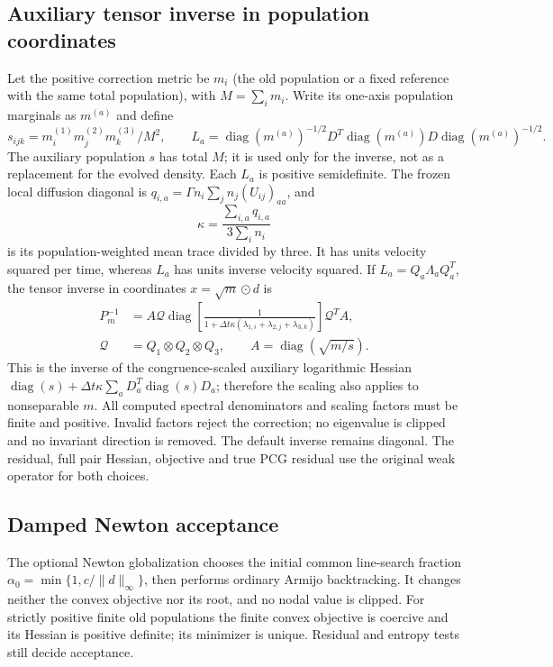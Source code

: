\documentclass[11pt,letterpaper]{article}
\begin{document}
\subsection{Auxiliary tensor inverse in population coordinates}
Let the positive correction metric be $m_i$ (the old population or a fixed
reference with the same total population), with $M=\sum_i m_i$. Write its
one-axis population marginals as $m^{(a)}$ and define
\[
 s_{ijk}=m^{(1)}_i m^{(2)}_j m^{(3)}_k/M^2,\qquad
 L_a=\operatorname{diag}(m^{(a)})^{-1/2}
       D^T\operatorname{diag}(m^{(a)})D
       \operatorname{diag}(m^{(a)})^{-1/2}.
\]
The auxiliary population $s$ has total $M$; it is used only for the inverse,
not as a replacement for the evolved density. Each $L_a$ is positive
semidefinite. The frozen local diffusion diagonal is
$q_{i,a}=\Gamma n_i\sum_j n_j(U_{ij})_{aa}$, and
\[
 \kappa=\frac{\sum_{i,a}q_{i,a}}{3\sum_i n_i}
\]
is its population-weighted mean trace divided by three. It has units
velocity squared per time, whereas $L_a$ has units inverse velocity squared.
If $L_a=Q_a\Lambda_aQ_a^T$, the tensor inverse in coordinates
$x=\sqrt m\odot d$ is
\begin{align}
 P_m^{-1}&=A\mathcal Q
  \operatorname{diag}\!\left[
    \frac1{1+\Delta t\kappa(\lambda_{1,i}+\lambda_{2,j}+\lambda_{3,k})}
  \right]\mathcal Q^T A,\\
 \mathcal Q&=Q_1\otimes Q_2\otimes Q_3,\qquad
 A=\operatorname{diag}(\sqrt{m/s}).
\end{align}
This is the inverse of the congruence-scaled auxiliary logarithmic Hessian
$\operatorname{diag}(s)+\Delta t\kappa\sum_a D_a^T\operatorname{diag}(s)D_a$;
therefore the scaling also applies to nonseparable $m$. All computed
spectral denominators and scaling factors must be finite and positive.
Invalid factors reject the correction; no eigenvalue is clipped and no
invariant direction is removed. The default inverse remains diagonal.
The residual, full pair Hessian, objective and true PCG residual use the
original weak operator for both choices.

\subsection{Damped Newton acceptance}
The optional Newton globalization chooses the initial common line-search
fraction $\alpha_0=\min\{1,c/\|d\|_\infty\}$, then performs ordinary Armijo
backtracking. It changes neither the convex objective nor its root, and no
nodal value is clipped. For strictly positive finite old populations the
finite convex objective is coercive and its Hessian is positive definite;
its minimizer is unique. Residual and entropy tests still decide acceptance.
\end{document}
